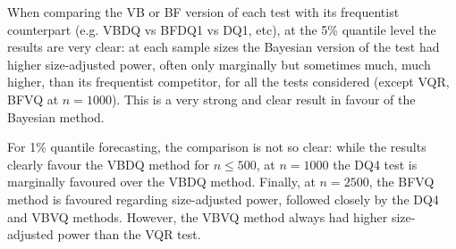 \documentclass[12pt,epsf]{article}
\begin{document}
%

When comparing the VB or BF version of each test with its frequentist counterpart (e.g. VBDQ vs BFDQ1 vs DQ1, etc),
at the 5\% quantile level the results are very clear: at each sample sizes the Bayesian version of the test had
higher size-adjusted power, often only marginally but sometimes much, much higher, than its frequentist competitor, for all the
tests considered (except VQR, BFVQ at $n=1000$). This is a very strong and clear result in favour of the Bayesian method.

For 1\% quantile forecasting, the comparison is not so clear: while the results clearly favour the VBDQ method for
$n \le 500$, at $n=1000$ the DQ4 test is marginally favoured over the VBDQ method. Finally, at $n=2500$, the
BFVQ method is favoured regarding size-adjusted power, followed closely by the DQ4 and VBVQ methods. However, the
VBVQ method always had higher size-adjusted power than the VQR test.
\end{document}
